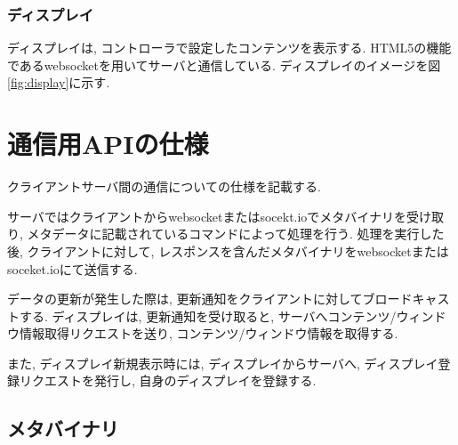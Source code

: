 \documentclass[a4paper,10pt,oneside]{jsbook}
\begin{document}

\subsection{ディスプレイ}
ディスプレイは, コントローラで設定したコンテンツを表示する. HTML5の機能であるwebsocketを用いてサーバと通信している. ディスプレイのイメージを図\ref{fig:display}に示す. 


\chapter{通信用APIの仕様}
クライアントサーバ間の通信についての仕様を記載する.

サーバではクライアントからwebsocketまたはsocekt.ioでメタバイナリを受け取り, メタデータに記載されているコマンドによって処理を行う. 処理を実行した後, クライアントに対して, レスポンスを含んだメタバイナリをwebsocketまたはsoceket.ioにて送信する.

データの更新が発生した際は, 更新通知をクライアントに対してブロードキャストする.
ディスプレイは, 更新通知を受け取ると, サーバへコンテンツ/ウィンドウ情報取得リクエストを送り, コンテンツ/ウィンドウ情報を取得する.

また, ディスプレイ新規表示時には, ディスプレイからサーバへ, ディスプレイ登録リクエストを発行し, 自身のディスプレイを登録する.



\section{メタバイナリ}
\end{document}
